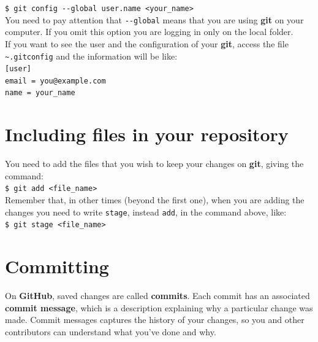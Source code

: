 \documentclass[12pt,a4paper,titlepage,brazil]{article}
\begin{document}
{\texttt{\$ git config -\hspace{0.01cm}-global user.name <your\_name>}\\

You need to pay attention that \texttt{-\hspace{0.01cm}-global} means that you are using {\bf git} on your computer. If you omit this option you are logging in only on the local folder.\\

If you want to see the user and the configuration of your {\bf git}, access the file \texttt{\~\/.gitconfig} and the information will be like:\\

\texttt{[user]}\\

\hspace{0.5cm}\texttt{email = you@example.com}\\

\hspace{0.5cm}\texttt{name = your\_name}\\


\section{Including files in your repository}

You need to add the files that you wish to keep your changes on {\bf git}, giving the command:\\

\texttt{\$ git add <file\_name>}\\

Remember that, in other times (beyond the first one), when you are adding the changes you need to write \texttt{stage}, instead \texttt{add}, in the command above, like:\\

\texttt{\$ git stage <file\_name>}


\section{Committing}

On {\bf GitHub}, saved changes are called {\bf commits}. Each commit has an associated {\bf commit message}, which is a description explaining why a particular change was made. Commit messages captures the history of your changes, so you and other contributors can understand what you’ve done and why.\\

}
\end{document}

